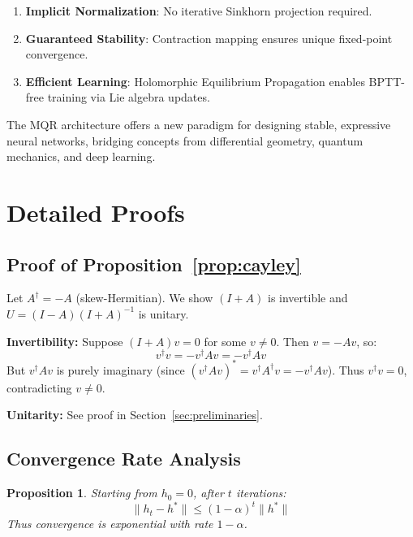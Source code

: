 \documentclass[11pt,a4paper]{article}
\newtheorem{proposition}[theorem]{Proposition}
\begin{document}
\begin{enumerate}
    \item \textbf{Implicit Normalization}: No iterative Sinkhorn projection required.
    \item \textbf{Guaranteed Stability}: Contraction mapping ensures unique fixed-point convergence.
    \item \textbf{Efficient Learning}: Holomorphic Equilibrium Propagation enables BPTT-free training via Lie algebra updates.
\end{enumerate}

The MQR architecture offers a new paradigm for designing stable, expressive neural networks, bridging concepts from differential geometry, quantum mechanics, and deep learning.

\appendix

\section{Detailed Proofs}
\label{app:proofs}

\subsection{Proof of Proposition~\ref{prop:cayley}}

Let $A^\dagger = -A$ (skew-Hermitian). We show $(I+A)$ is invertible and $U = (I-A)(I+A)^{-1}$ is unitary.

\textbf{Invertibility:} Suppose $(I+A)v = 0$ for some $v \neq 0$. Then $v = -Av$, so:
\begin{equation}
v^\dagger v = -v^\dagger A v = -v^\dagger A v
\end{equation}
But $v^\dagger A v$ is purely imaginary (since $(v^\dagger A v)^* = v^\dagger A^\dagger v = -v^\dagger A v$). Thus $v^\dagger v = 0$, contradicting $v \neq 0$.

\textbf{Unitarity:} See proof in Section~\ref{sec:preliminaries}.

\subsection{Convergence Rate Analysis}

\begin{proposition}
Starting from $h_0 = 0$, after $t$ iterations:
\begin{equation}
\|h_t - h^*\| \leq (1-\alpha)^t \|h^*\|
\end{equation}
Thus convergence is exponential with rate $1-\alpha$.
\end{proposition}
\end{document}
